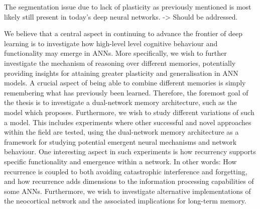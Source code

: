 The segmentation issue due to lack of plasticity as previously mentioned is most likely still present in today's deep neural networks. -> Should be addressed.



We believe that a central aspect in continuing to advance the frontier of deep learning is to investigate how high-level level cognitive behaviour and functionality may emerge in ANNs. More specifically, we wish to further investigate the mechanism of reasoning over different memories, potentially providing insights for attaining greater plasticity and generalisation in ANN models. A crucial aspect of being able to combine different memories is simply remembering what has previously been learned. Therefore, the foremost goal of the thesis is to investigate a dual-network memory architecture, such as the model which \cite{Hattori2014} proposes. Furthermore, we wish to study different variations of such a model. This includes experiments where other successful and novel approaches within the field are tested, using the dual-network memory architecture as a framework for studying potential emergent neural mechanisms and network behaviour.
One interesting aspect in such experiments is how recurrency supports specific functionality and emergence within a network. In other words: How recurrence is coupled to both avoiding catastrophic interference and forgetting, and how recurrence adds dimensions to the information processing capabilities of some ANNs. Furthermore, we wish to investigate alternative implementations of the neocortical network and the associated implications for long-term memory.

\cleardoublepage